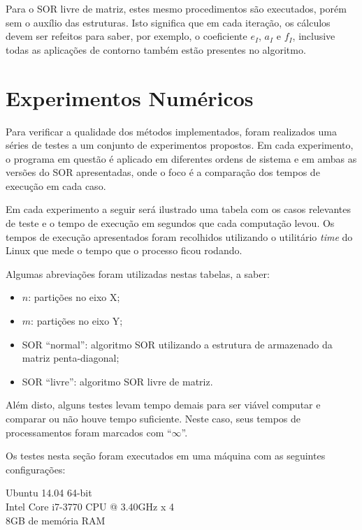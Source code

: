 \documentclass[
	11pt,				%
	oneside,			%
	a4paper,			%
	english,			%
	brazil,				%
	]{article}
\begin{document}
Para o SOR livre de matriz, estes mesmo procedimentos são executados, porém sem 
o auxílio das estruturas. Isto significa que em cada iteração, os cálculos 
devem ser refeitos para saber, por exemplo, o coeficiente $e_I$, $a_I$ e $f_I$, 
inclusive todas as aplicações de contorno também estão presentes no algoritmo.

\section{Experimentos Numéricos}
Para verificar a qualidade dos métodos implementados, foram realizados uma 
séries de testes a um conjunto de experimentos propostos. Em cada experimento, 
o programa em questão é aplicado em diferentes ordens de sistema e em ambas as 
versões do SOR apresentadas, onde o foco é a comparação dos tempos de execução 
em cada caso.

Em cada experimento a seguir será ilustrado uma tabela com os casos 
relevantes de teste e o tempo de execução em segundos que cada computação 
levou. Os tempos de execução apresentados foram recolhidos utilizando 
o utilitário \textit{time} do Linux que mede o tempo que o processo ficou 
rodando.

Algumas abreviações foram utilizadas nestas tabelas, a saber:
\begin{itemize}
 \item $n$: partições no eixo X;
 \item $m$: partições no eixo Y;
 \item SOR ``normal'': algoritmo SOR utilizando a estrutura de
 armazenado da matriz penta-diagonal;
 \item SOR ``livre'': algoritmo SOR livre de matriz.
\end{itemize}

Além disto, alguns testes levam tempo demais para ser viável computar e 
comparar ou não houve tempo suficiente. Neste caso, seus tempos de 
processamentos foram marcados com ``$\infty$''.

Os testes nesta seção foram executados em uma máquina com as seguintes 
configurações:

Ubuntu 14.04 64-bit \\
\indent Intel Core i7-3770 CPU @ 3.40GHz x 4 \\
\indent 8GB de memória RAM
\end{document}
